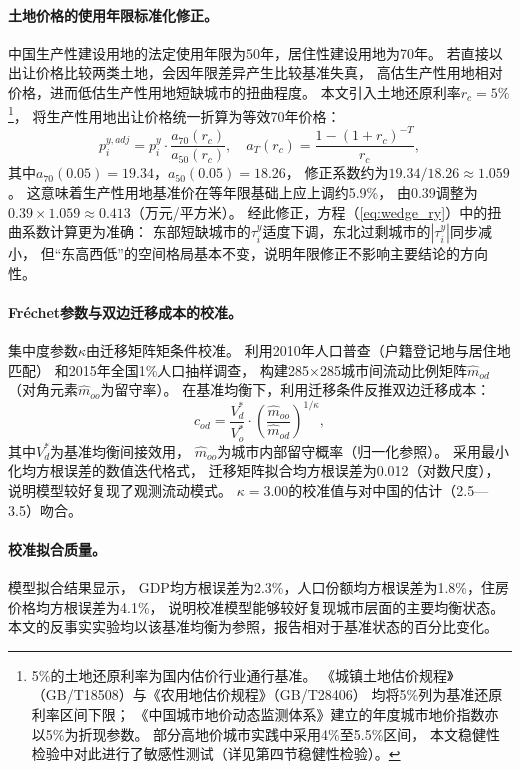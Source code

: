 \documentclass[UTF8,a4paper,12pt]{ctexart}
\theoremstyle{plain}
\theoremstyle{definition}
\theoremstyle{remark}
\newcommand{\tauy}{\tau^{y}}
\begin{document}
\paragraph{土地价格的使用年限标准化修正。}
中国生产性建设用地的法定使用年限为50年，居住性建设用地为70年。
若直接以出让价格比较两类土地，会因年限差异产生比较基准失真，
高估生产性用地相对价格，进而低估生产性用地短缺城市的扭曲程度。
本文引入土地还原利率$r_c=5\%$\footnote{%
  5\%的土地还原利率为国内估价行业通行基准。
  《城镇土地估价规程》（GB/T18508）与《农用地估价规程》（GB/T28406）
  均将5\%列为基准还原利率区间下限；
  《中国城市地价动态监测体系》建立的年度城市地价指数亦以5\%为折现参数。
  部分高地价城市实践中采用4\%至5.5\%区间，
  本文稳健性检验中对此进行了敏感性测试（详见第四节稳健性检验）。}，
将生产性用地出让价格统一折算为等效70年价格：
\begin{equation}
  p_i^{y,adj}=p_i^y\cdot\frac{a_{70}(r_c)}{a_{50}(r_c)},
  \quad a_T(r_c)=\frac{1-(1+r_c)^{-T}}{r_c},
  \label{eq:land_adj}
\end{equation}
其中$a_{70}(0.05)=19.34$，$a_{50}(0.05)=18.26$，
修正系数约为$19.34/18.26\approx 1.059$。
这意味着生产性用地基准价在等年限基础上应上调约5.9\%，
由0.39调整为$0.39\times1.059\approx0.413$（万元/平方米）。
经此修正，方程（\ref{eq:wedge_ry}）中的扭曲系数计算更为准确：
东部短缺城市的$\tauy_i$适度下调，东北过剩城市的$|\tauy_i|$同步减小，
但``东高西低''的空间格局基本不变，说明年限修正不影响主要结论的方向性。

\paragraph{Fréchet参数与双边迁移成本的校准。}
集中度参数$\kappa$由迁移矩阵矩条件校准。
利用2010年人口普查（户籍登记地与居住地匹配）
和2015年全国1\%人口抽样调查，
构建285×285城市间流动比例矩阵$\hat{m}_{od}$（对角元素$\hat{m}_{oo}$为留守率）。
在基准均衡下，利用迁移条件反推双边迁移成本：
\begin{equation}
  c_{od}=\frac{V_d^*}{V_o^*}\cdot\left(\frac{\hat{m}_{oo}}{\hat{m}_{od}}\right)^{1/\kappa},
  \label{eq:mig_cost}
\end{equation}
其中$V_d^*$为基准均衡间接效用，
$\hat{m}_{oo}$为城市内部留守概率（归一化参照）。
采用最小化均方根误差的数值迭代格式，
迁移矩阵拟合均方根误差为0.012（对数尺度），
说明模型较好复现了观测流动模式。
$\kappa=3.00$的校准值与\citet{redding2017}对中国的估计（2.5—3.5）吻合。

\paragraph{校准拟合质量。}
模型拟合结果显示，
GDP均方根误差为2.3\%，人口份额均方根误差为1.8\%，住房价格均方根误差为4.1\%，
说明校准模型能够较好复现城市层面的主要均衡状态。
本文的反事实实验均以该基准均衡为参照，报告相对于基准状态的百分比变化。
\end{document}
